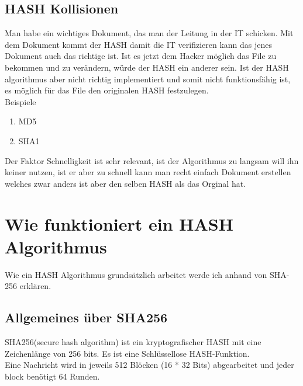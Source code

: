 {\subsection{HASH Kollisionen}
\label{sec:hash_coll}
Man habe ein wichtiges Dokument, das man der Leitung in der IT schicken. Mit dem Dokument kommt der HASH damit die IT verifizieren kann das jenes Dokument auch das richtige ist. Ist es jetzt dem Hacker möglich das File zu bekommen und zu verändern, würde der HASH ein anderer sein. Ist der HASH algorithmus aber nicht richtig implementiert und somit nicht funktionsfähig ist, es möglich für das File den originalen HASH festzulegen.
\\
Beispiele
\begin{enumerate}
\item MD5
\item SHA1
\end{enumerate}
Der Faktor Schnelligkeit ist sehr relevant, ist der Algorithmus zu langsam will ihn keiner nutzen, ist er aber zu schnell kann man recht einfach Dokument erstellen welches zwar anders ist aber den selben HASH als das Orginal hat.
\section{Wie funktioniert ein HASH Algorithmus}
\label{sec:hash_algo}
Wie ein HASH Algorithmus grundsätzlich arbeitet werde ich anhand von SHA-256 erklären. 
\subsection{Allgemeines über SHA256}
\label{sec:hash_sha}
SHA256(secure hash algorithm) ist ein kryptografischer HASH mit eine Zeichenlänge von 256 bits. Es ist eine Schlüssellose HASH-Funktion.
\\
Eine Nachricht wird in jeweils 512 Blöcken (16 * 32 Bits) abgearbeitet und jeder block benötigt 64 Runden.
}
